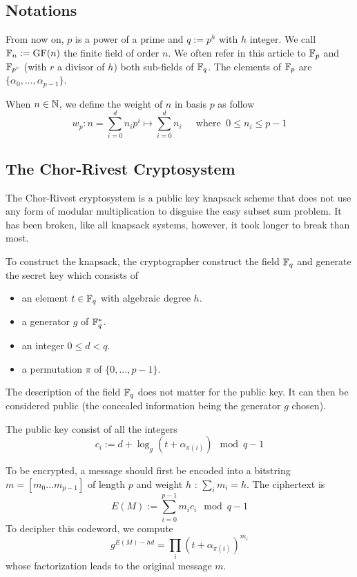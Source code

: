 \documentclass[a4paper]{article}
\newcommand{\GF}[1]{\F_{#1}}
\begin{document}
\subsection{Notations}

From now on, $p$ is a power of a prime and $q := p^h$ with $h$ integer. We call $\mathbb{F}_n := \text{GF}(n)$ the finite field of order $n$. We often refer in this article to $\mathbb{F}_p$ and $\mathbb{F}_{p^r}$ (with $r$ a divisor of $h$) both sub-fields of $\mathbb{F}_q$. The elements of $\mathbb{F}_p$ are $\{ \alpha_0, ... , \alpha_{p-1} \}$.

When $n \in \mathbb{N}$, we define the weight of $n$ in basis $p$ as follow
$$ w_p : n = \sum_{i=0}^{d} n_i p^i \longmapsto \sum_{i=0}^{d} n_i \ \ \ \ \ \text{ where }  \ 0 \leq n_i \leq p-1 $$

\subsection{The Chor-Rivest Cryptosystem}

The Chor-Rivest cryptosystem is a public key knapsack scheme that does not use any form of modular multiplication to disguise the easy subset sum problem. It has been broken, like all knapsack systems, however, it took longer to break than most.

To construct the knapsack, the cryptographer construct the field $\mathbb{F}_q$ and generate the secret key which consists of
\begin{itemize}
\item an element $t \in \GF{q}$ with algebraic degree $h$.
\item a generator $g$ of $\GF{q}^{*}$.
\item an integer $0 \leq d < q$.
\item a permutation $\pi$ of $\{ 0, ... , p-1 \}$.
\end{itemize}
The description of the field $\mathbb{F}_q$ does not matter for the public key. It can then be considered public (the concealed information being the generator $g$ chosen).

The public key consist of all the integers
$$ c_i := d + \log_g(t + \alpha_{\pi(i)}) \mod q-1 $$

To be encrypted, a message should first be encoded into a bitstring $m = [m_0...m_{p-1}]$ of length $p$ and weight $h$ : $\sum_i m_i = h$. The ciphertext is
$$ E(M) := \sum_{i=0}^{p-1} m_i c_i \mod q-1 $$
To decipher this codeword, we compute
$$ g^{E(M) - hd} =  \prod_i \left( t + \alpha_{\pi(i)}\right)^{m_i} $$
whose factorization leads to the original message $m$.
\end{document}
